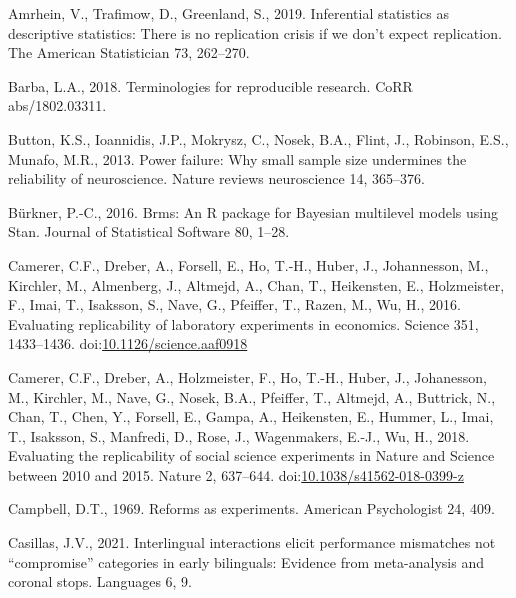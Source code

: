 \documentclass[]{elsarticle} %
\newlength{\cslhangindent}
\newlength{\cslentryspacingunit} %
\newenvironment{CSLReferences}[2] %
 {%
  \setlength{\parindent}{0pt}
  \ifodd #1
  \let\oldpar\par
  \def\par{\hangindent=\cslhangindent\oldpar}
  \fi
  \setlength{\parskip}{#2\cslentryspacingunit}
 }%
 {}
\begin{document}
\hypertarget{refs}{}
\begin{CSLReferences}{1}{0}
\leavevmode\hypertarget{ref-amrhein2019inferential}{}%
Amrhein, V., Trafimow, D., Greenland, S., 2019. Inferential statistics as descriptive statistics: There is no replication crisis if we don't expect replication. The American Statistician 73, 262--270.

\leavevmode\hypertarget{ref-barba_terminologies_2018}{}%
Barba, L.A., 2018. Terminologies for reproducible research. CoRR abs/1802.03311.

\leavevmode\hypertarget{ref-button2013power}{}%
Button, K.S., Ioannidis, J.P., Mokrysz, C., Nosek, B.A., Flint, J., Robinson, E.S., Munafo, M.R., 2013. Power failure: Why small sample size undermines the reliability of neuroscience. Nature reviews neuroscience 14, 365--376.

\leavevmode\hypertarget{ref-burkner_brms_2016}{}%
Bürkner, P.-C., 2016. Brms: {An} {R} package for {Bayesian} multilevel models using {Stan}. Journal of Statistical Software 80, 1--28.

\leavevmode\hypertarget{ref-camerer_evaluating_2016}{}%
Camerer, C.F., Dreber, A., Forsell, E., Ho, T.-H., Huber, J., Johannesson, M., Kirchler, M., Almenberg, J., Altmejd, A., Chan, T., Heikensten, E., Holzmeister, F., Imai, T., Isaksson, S., Nave, G., Pfeiffer, T., Razen, M., Wu, H., 2016. Evaluating replicability of laboratory experiments in economics. Science 351, 1433--1436. doi:\href{https://doi.org/10.1126/science.aaf0918}{10.1126/science.aaf0918}

\leavevmode\hypertarget{ref-camerer_evaluating_2018}{}%
Camerer, C.F., Dreber, A., Holzmeister, F., Ho, T.-H., Huber, J., Johanesson, M., Kirchler, M., Nave, G., Nosek, B.A., Pfeiffer, T., Altmejd, A., Buttrick, N., Chan, T., Chen, Y., Forsell, E., Gampa, A., Heikensten, E., Hummer, L., Imai, T., Isaksson, S., Manfredi, D., Rose, J., Wagenmakers, E.-J., Wu, H., 2018. Evaluating the replicability of social science experiments in {Nature} and {Science} between 2010 and 2015. Nature 2, 637--644. doi:\href{https://doi.org/10.1038/s41562-018-0399-z}{10.1038/s41562-018-0399-z}

\leavevmode\hypertarget{ref-campbell_reforms_1969}{}%
Campbell, D.T., 1969. Reforms as experiments. American Psychologist 24, 409.

\leavevmode\hypertarget{ref-casillas2021interlingual}{}%
Casillas, J.V., 2021. Interlingual interactions elicit performance mismatches not {``compromise''} categories in early bilinguals: Evidence from meta-analysis and coronal stops. Languages 6, 9.


\end{CSLReferences}
\end{document}
